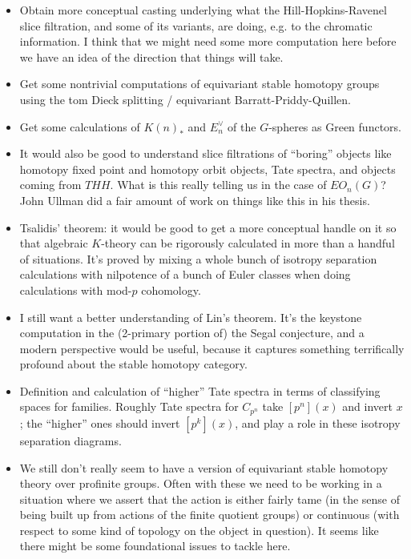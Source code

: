 \documentclass[12pt,titlepage]{article}
\theoremstyle{plain}
\theoremstyle{definition}
\theoremstyle{remark}
\begin{document}
\begin{itemize}%
\item Obtain more conceptual casting underlying what the Hill-Hopkins-Ravenel slice filtration, and some of its variants, are doing, e.g. to the chromatic information. I think that we might need some more computation here before we have an idea of the direction that things will take.


\item Get some nontrivial computations of equivariant stable homotopy groups using the tom Dieck splitting / equivariant Barratt-Priddy-Quillen.


\item Get some calculations of $K(n)_*$ and $E_n^\vee$ of the $G$-spheres as Green functors.


\item It would also be good to understand slice filtrations of ``{}boring''{} objects like homotopy fixed point and homotopy orbit objects, Tate spectra, and objects coming from $THH$. What is this really telling us in the case of $EO_n(G)$? John Ullman did a fair amount of work on things like this in his thesis.


\item Tsalidis'{} theorem: it would be good to get a more conceptual handle on it so that algebraic $K$-theory can be rigorously calculated in more than a handful of situations. It'{}s proved by mixing a whole bunch of isotropy separation calculations with nilpotence of a bunch of Euler classes when doing calculations with mod-$p$ cohomology.


\item I still want a better understanding of Lin'{}s theorem. It'{}s the keystone computation in the (2-primary portion of) the Segal conjecture, and a modern perspective would be useful, because it captures something terrifically profound about the stable homotopy category.


\item Definition and calculation of ``{}higher''{} Tate spectra in terms of classifying spaces for families. Roughly Tate spectra for $C_{p^n}$ take $[p^n](x)$ and invert $x$; the ``{}higher''{} ones should invert $[p^k](x)$, and play a role in these isotropy separation diagrams.


\item We still don'{}t really seem to have a version of equivariant stable homotopy theory over profinite groups. Often with these we need to be working in a situation where we assert that the action is either fairly tame (in the sense of being built up from actions of the finite quotient groups) or continuous (with respect to some kind of topology on the object in question). It seems like there might be some foundational issues to tackle here.



\end{itemize}
\end{document}
